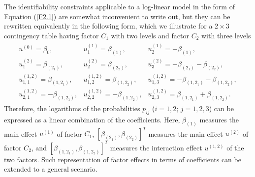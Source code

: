 The identifiability constraints applicable to a log-linear model in the form of
Equation (\ref{F2.1}) are somewhat inconvenient to write out, but they can be
rewritten equivalently in the following form, which we illustrate for a $2\times 3$
contingency table having factor $C_1$ with two levels and factor $C_2$ with three
levels
\begin{eqnarray}
\begin{array}{lll}
u^{(0)}=\beta_0, & u^{(1)}_1=\beta_{(1)}, &
u^{(1)}_2=-\beta_{(1)},\\
u^{(2)}_1=\beta_{(2_1)}, & u^{(2)}_2=\beta_{(2_2)}, &
u^{(2)}_3=-\beta_{(2_1)}-\beta_{(2_2)},\\
u^{(1,2)}_{1,1}=\beta_{(1,2_1)}, & u^{(1,2)}_{1,2}=\beta_{(1,2_2)},
& u^{(1,2)}_{1,3}=-\beta_{(1,2_1)}-\beta_{(1,2_2)}, \\
u^{(1,2)}_{2,1}=-\beta_{(1,2_1)}, & u^{(1,2)}_{2,2}=-\beta_{(1,2_2)}, &
u^{(1,2)}_{2,3}=\beta_{(1,2_1)}+\beta_{(1,2_2)}.
\end{array}
\nonumber
\end{eqnarray}
Therefore, the logarithms of the probabilities $p_{ij}$ ($i=1,2$; $j=1,2,3$) can be
expressed as a linear combination of the coefficients. Here, $\beta_{(1)}$ measures
the main effect $u^{(1)}$ of factor $C_1$, $[\beta_{(2_1)},\beta_{(2_2)}]^T$
measures the main effect $u^{(2)}$ of factor $C_2$, and
$[\beta_{(1,2_1)},\beta_{(1,2_2)}]^T$ measures the interaction effect $u^{(1,2)}$ of
the two factors. Such representation of factor effects in terms of coefficients can
be extended to a general scenario.

